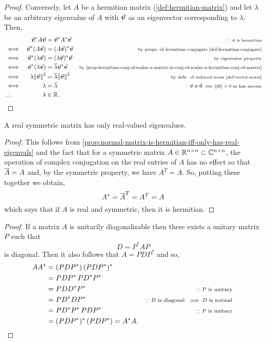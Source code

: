 \documentclass[../MathsNotesBase.tex]{subfiles}
\begin{document}
{\begin{proof}
			Conversely, let $A$ be a hermitian matrix (\ref{def:hermitian-matrix}) and let $\lambda$ be an arbitrary eigenvalue of $A$ with $\vec{\bm{v}}$ as an eigenvector corresponding to $\lambda$. Then,
			\[\begin{aligned}
				&& \vec{\bm{v}}^* A \vec{\bm{v}} &= \vec{\bm{v}}^* A^* \vec{\bm{v}}   &\text{\scriptsize{${ \because A }$ is hermitian}}\\
				&\iff & \vec{\bm{v}}^* (A \vec{\bm{v}}) &= (A \vec{\bm{v}})^* \vec{\bm{v}}   &\text{\scriptsize{by props. of hermitian conjugate \ref{def:hermitian-conjugate}}} \\
				&\iff & \vec{\bm{v}}^* (\lambda \vec{\bm{v}}) &= (\lambda \vec{\bm{v}})^* \vec{\bm{v}}   &\text{\scriptsize{by eigenvalue property}}\\
				&\iff & \vec{\bm{v}}^* (\lambda \vec{\bm{v}}) &= \overline{\lambda} \vec{\bm{v}}^* \vec{\bm{v}}   &\text{\scriptsize{by \ref{prop:hermitian-conj-of-scalar-x-matrix-is-conj-of-scalar-x-hermitian-conj-of-matrix}}}\\
				&\iff & \lambda \norm{\vec{\bm{v}}}^2 &= \overline{\lambda} \norm{\vec{\bm{v}}}^2   &\text{\scriptsize{by defn. of induced norm \ref{def:vector-norm}}} \\
				&\iff & \lambda &= \overline{\lambda}   &\text{\scriptsize{${ \because \vec{\bm{v}} \neq \vec{\bm{0}} \implies \norm{\vec{\bm{v}}} > 0 }$ so has inverse}} \\
				&\therefore & \lambda &\in \mathbb{R}^{}.  \qedhere
			\end{aligned}\]
		\end{proof}
		\begin{corollary}
			A real symmetric matrix has only real-valued eigenvalues.
		\end{corollary}
		\begin{proof}
			This follows from \autoref{prop:normal-matrix-is-hermitian-iff-only-has-real-eigenvals} and the fact that for a symmetric matrix ${ A \in \mathbb{R}^{n \times n} \subset \mathbb{C}^{n \times n} }$, the operation of complex conjugation on the real entries of $A$ has no effect so that ${ \overline{A} = A }$ and, by the symmetric property, we have ${ A^T = A }$. So, putting these together we obtain,
			\[ A^* = \overline{A}^T = A^T = A \]
			which says that if $A$ is real and symmetric, then it is hermitian.
		\end{proof}
	
		
		\bigskip
		\begin{proof}
			If a matrix $A$ is unitarily diagonalisable then there exists a unitary matrix $P$ such that
			\[ D = P^* A P \]
			is diagonal. Then it also follows that ${ A = P D P^* }$ and so,
			\[\begin{aligned}
				A A^* &= (P D P^*) \, (P D P^*)^* \\
				&= P D P^* \, P D^* P^* &\text{\scriptsize{}} \\
				&= P D D^* P^* &\text{\scriptsize{${ \because P \text{ is unitary } }$}} \\
				&= P D^* D P^* &\text{\scriptsize{${ \because D \text{ is diagonal } \implies D \text{ is normal }  }$}} \\
				&= P D^* P^* \, P D P^* &\text{\scriptsize{${ \because P \text{ is unitary } }$}} \\
				&= (P D P^*)^* \, (P D P^*) = A^* A.
			\end{aligned}\]
			

\end{proof}}
\end{document}
